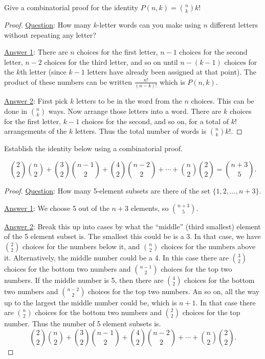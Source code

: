 \begin{questions}
	
	
	
\question Give a combinatorial proof for the identity $P(n,k) = {n \choose k}k!$
	
	\begin{answer}
		\begin{proof}
         \underline{Question}: How many $k$-letter words can you make using $n$ different letters without repeating any letter?
         
         \underline{Answer 1}: There are $n$ choices for the first letter, $n-1$ choices for the second letter, $n-2$ choices for the third letter, and so on until $n - (k-1)$ choices for the $k$th letter (since $k-1$ letters have already been assigned at that point).  The product of these numbers can be written $\frac{n!}{(n-k)!}$ which is $P(n,k)$.
         
         \underline{Answer 2}: First pick $k$ letters to be in the word from the $n$ choices.  This can be done in ${n \choose k}$ ways.  Now arrange those letters into a word.  There are $k$ choices for the first letter, $k-1$ choices for the second, and so on, for a total of $k!$ arrangements of the $k$ letters.  Thus the total number of words is ${n \choose k}k!$.
        \end{proof}
	\end{answer}
	
	
	
\question Establish the identity below using a combinatorial proof.

\[{2 \choose 2}{n \choose 2} + {3 \choose 2}{n-1 \choose 2} + {4\choose 2}{n-2 \choose 2} + \cdots + {n\choose 2}{2\choose 2} = {n+3 \choose 5}. \]


	\begin{answer}
		\begin{proof}
		\underline{Question}: How many 5-element subsets are there of the set $\{1,2,\ldots, n+3\}$.
		
		\underline{Answer 1}: We choose 5 out of the $n+3$ elements, so ${n+3 \choose 5}$.
		
		\underline{Answer 2}: Break this up into cases by what the ``middle'' (third smallest) element of the 5 element subset is.  The smallest this could be is a 3.  In that case, we have ${2 \choose 2}$ choices for the numbers below it, and ${n \choose 2}$ choices for the numbers above it.  Alternatively, the middle number could be a 4.  In this case there are ${3 \choose 2}$ choices for the bottom two numbers and ${n-1 \choose 2}$ choices for the top two numbers.  If the middle number is 5, then there are ${4 \choose 2}$ choices for the bottom two numbers and ${n-2 \choose 2}$ choices for the top two numbers.  An so on, all the way up to the largest the middle number could be, which is $n+1$.  In that case there are ${n \choose 2}$ choices for the bottom two numbers and ${2 \choose 2}$ choices for the top number.  Thus the number of 5 element subsets is.
		\[{2 \choose 2}{n \choose 2} + {3 \choose 2}{n-1 \choose 2} + {4\choose 2}{n-2 \choose 2} + \cdots + {n\choose 2}{2\choose 2}.\]
		\end{proof}
	\end{answer}
	
	
	
\end{questions}